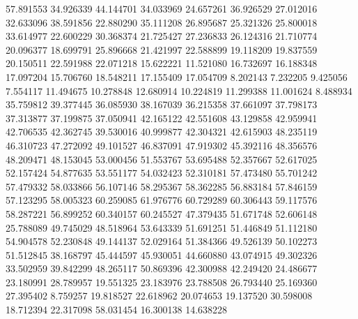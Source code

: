57.891553
34.926339
44.144701
34.033969
24.657261
36.926529
27.012016
32.633096
38.591856
22.880290
35.111208
26.895687
25.321326
25.800018
33.614977
22.600229
30.368374
21.725427
27.236833
26.124316
21.710774
20.096377
18.699791
25.896668
21.421997
22.588899
19.118209
19.837559
20.150511
22.591988
22.071218
15.622221
11.521080
16.732697
16.188348
17.097204
15.706760
18.548211
17.155409
17.054709
8.202143
7.232205
9.425056
7.554117
11.494675
10.278848
12.680914
10.224819
11.299388
11.001624
8.488934
35.759812
39.377445
36.085930
38.167039
36.215358
37.661097
37.798173
37.313877
37.199875
37.050941
42.165122
42.551608
43.129858
42.959941
42.706535
42.362745
39.530016
40.999877
42.304321
42.615903
48.235119
46.310723
47.272092
49.101527
46.837091
47.919302
45.392116
48.356576
48.209471
48.153045
53.000456
51.553767
53.695488
52.357667
52.617025
52.157424
54.877635
53.551177
54.032423
52.310181
57.473480
55.701242
57.479332
58.033866
56.107146
58.295367
58.362285
56.883184
57.846159
57.123295
58.005323
60.259085
61.976776
60.729289
60.306443
59.117576
58.287221
56.899252
60.340157
60.245527
47.379435
51.671748
52.606148
25.788089
49.745029
48.518964
53.643339
51.691251
51.446849
51.112180
54.904578
52.230848
49.144137
52.029164
51.384366
49.526139
50.102273
51.512845
38.168797
45.444597
45.930051
44.660880
43.074915
49.302326
33.502959
39.842299
48.265117
50.869396
42.300988
42.249420
24.486677
23.180991
28.789957
19.551325
23.183976
23.788508
26.793440
25.169360
27.395402
8.759257
19.818527
22.618962
20.074653
19.137520
30.598008
18.712394
22.317098
58.031454
16.300138
14.638228